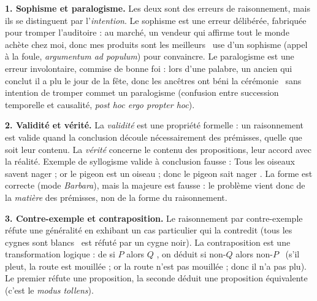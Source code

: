 \documentclass[11pt]{article}
\newcommand{\cle}[1]{{\popxbold\color{popdark}#1}}
\begin{document}
\begin{corrige}
\textbf{1. Sophisme et paralogisme.} Les deux sont des erreurs de raisonnement, mais ils se distinguent par l'\emph{intention}. Le \cle{sophisme} est une erreur délibérée, fabriquée pour tromper l'auditoire : au marché, un vendeur qui affirme \guillemotleft tout le monde achète chez moi, donc mes produits sont les meilleurs \guillemotright\ use d'un sophisme (appel à la foule, \emph{argumentum ad populum}) pour convaincre. Le \cle{paralogisme} est une erreur involontaire, commise de bonne foi : lors d'une palabre, un ancien qui conclut \guillemotleft il a plu le jour de la fête, donc les ancêtres ont béni la cérémonie \guillemotright\ sans intention de tromper commet un paralogisme (confusion entre succession temporelle et causalité, \emph{post hoc ergo propter hoc}).

\textbf{2. Validité et vérité.} La \emph{validité} est une propriété formelle : un raisonnement est valide quand la conclusion découle nécessairement des prémisses, quelle que soit leur contenu. La \emph{vérité} concerne le contenu des propositions, leur accord avec la réalité. Exemple de syllogisme valide à conclusion fausse : \guillemotleft Tous les oiseaux savent nager ; or le pigeon est un oiseau ; donc le pigeon sait nager \guillemotright. La forme est correcte (mode \emph{Barbara}), mais la majeure est fausse : le problème vient donc de la \emph{matière} des prémisses, non de la forme du raisonnement.

\textbf{3. Contre-exemple et contraposition.} Le raisonnement par \cle{contre-exemple} réfute une généralité en exhibant un cas particulier qui la contredit (\guillemotleft tous les cygnes sont blancs \guillemotright\ est réfuté par un cygne noir). La \cle{contraposition} est une transformation logique : de \guillemotleft si $P$ alors $Q$ \guillemotright, on déduit \guillemotleft si non-$Q$ alors non-$P$ \guillemotright\ (s'il pleut, la route est mouillée ; or la route n'est pas mouillée ; donc il n'a pas plu). Le premier réfute une proposition, la seconde déduit une proposition équivalente (c'est le \emph{modus tollens}).
\end{corrige}
\end{document}
